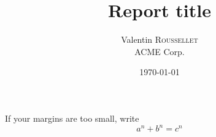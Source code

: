 \documentclass[a4paper, 10pt]{report}
\title{Report title}
\author{Valentin \textsc{Roussellet} \\
ACME Corp.}
\date{\today}
\numberwithin{equation}{section} %
\begin{document}
\maketitle
If your margins are too small, write
\[ a^n + b^n = c^n \]
\end{document}
